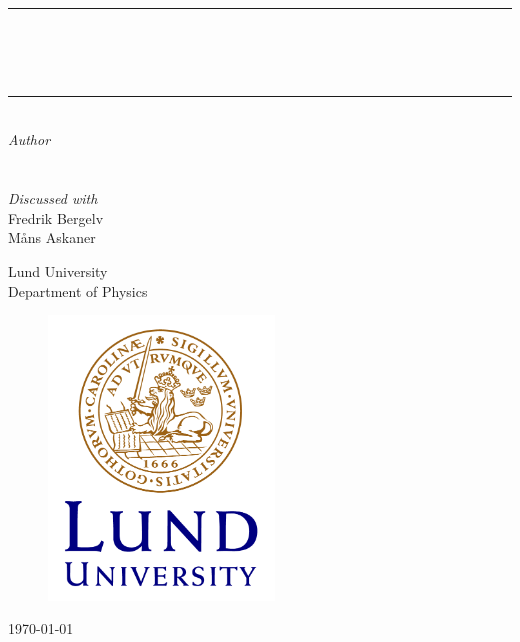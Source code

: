 \begin{titlepage}
    \vspace*{\fill}	\newcommand{\HRule}{\rule{\linewidth}{0.5mm}}
	\center 
	\HRule\\[0.4cm]
	{\huge\bfseries \nameoflab}\\[0.4cm]
        {\Large\bfseries \coursecode}\\[0.1cm]
	\HRule\\[1.5cm]

    \large
    \textit{Author}\\
    \authorOne  \\ \texttt{\authorOneMail} \\
	\textit{Discussed with}\\
	Fredrik Bergelv\\
	Måns Askaner
    
    \vspace{1cm}
     
    Lund University\\
    Department of Physics
     
    
    \begin{figure}[H]
        \centering        
        \includegraphics[width=6cm]{format/lund.png}
    \end{figure}
    
    \bigbreak
    \vfill
    \today
\end{titlepage}